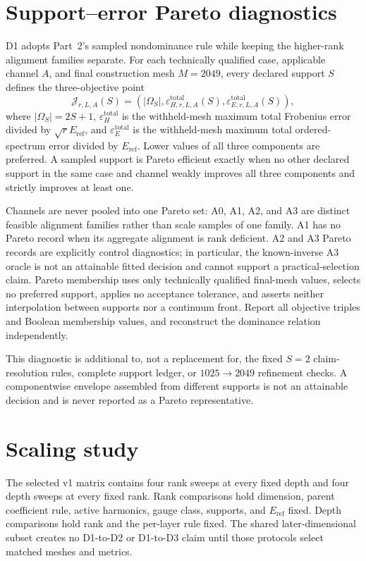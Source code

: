 \documentclass[11pt]{article}
\begin{document}
\section{Support--error Pareto diagnostics}

D1 adopts Part~2's sampled nondominance rule while keeping the higher-rank alignment
families separate. For each technically qualified case, applicable channel $A$, and
final construction mesh $M=2049$, every declared support $S$ defines the three-objective
point
\[
 \mathcal J_{r,L,A}(S)=\left(
 |\Omega_S|,
 \varepsilon_{H,r,L,A}^{\mathrm{total}}(S),
 \varepsilon_{E,r,L,A}^{\mathrm{total}}(S)
 \right),
\]
where $|\Omega_S|=2S+1$, $\varepsilon_H^{\mathrm{total}}$ is the withheld-mesh maximum
total Frobenius error divided by $\sqrt rE_{\mathrm{ref}}$, and
$\varepsilon_E^{\mathrm{total}}$ is the withheld-mesh maximum total ordered-spectrum
error divided by $E_{\mathrm{ref}}$. Lower values of all three components are preferred.
A sampled support is Pareto efficient exactly when no other declared support in the same
case and channel weakly improves all three components and strictly improves at least one.

Channels are never pooled into one Pareto set: A0, A1, A2, and A3 are distinct feasible
alignment families rather than scale samples of one family. A1 has no Pareto record
when its aggregate alignment is rank deficient. A2 and A3 Pareto records are explicitly
control diagnostics; in particular, the known-inverse A3 oracle is not an attainable
fitted decision and cannot support a practical-selection claim. Pareto membership uses
only technically qualified final-mesh values, selects no preferred support, applies no
acceptance tolerance, and asserts neither interpolation between supports nor a continuum
front. Report all objective triples and Boolean membership values, and reconstruct the
dominance relation independently.

This diagnostic is additional to, not a replacement for, the fixed $S=2$ claim-resolution
rules, complete support ledger, or $1025\rightarrow2049$ refinement checks. A
componentwise envelope assembled from different supports is not an attainable decision
and is never reported as a Pareto representative.

\section{Scaling study}

The selected v1 matrix contains four rank sweeps at every fixed depth and four depth
sweeps at every fixed rank. Rank comparisons hold dimension, parent coefficient rule,
active harmonics, gauge class, supports, and $E_{\mathrm{ref}}$ fixed. Depth comparisons
hold rank and the per-layer rule fixed. The shared later-dimensional subset creates no
D1-to-D2 or D1-to-D3 claim until those protocols select matched meshes and metrics.
\end{document}
